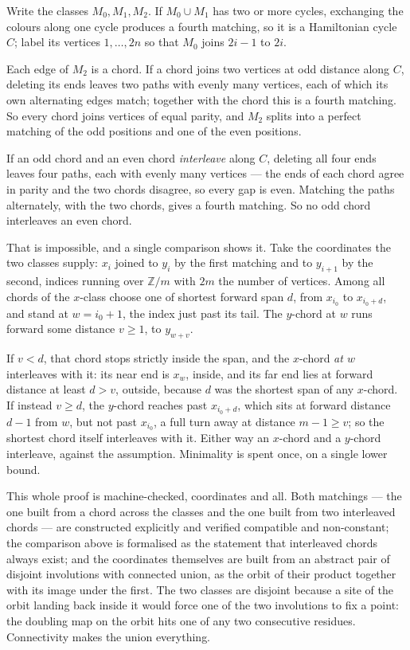 \documentclass[11pt]{article}
\theoremstyle{definition}
\theoremstyle{remark}
\begin{document}
Write the classes $M_0, M_1, M_2$. If $M_0 \cup M_1$ has two or more cycles, exchanging
the colours along one cycle produces a fourth matching, so it is a Hamiltonian cycle $C$;
label its vertices $1,\dots,2n$ so that $M_0$ joins $2i-1$ to $2i$.

Each edge of $M_2$ is a chord. If a chord joins two vertices at odd distance along $C$,
deleting its ends leaves two paths with evenly many vertices, each of which its own
alternating edges match; together with the chord this is a fourth matching. So every
chord joins vertices of equal parity, and $M_2$ splits into a perfect matching of the odd
positions and one of the even positions.

If an odd chord and an even chord \emph{interleave} along $C$, deleting all four ends
leaves four paths, each with evenly many vertices --- the ends of each chord agree in
parity and the two chords disagree, so every gap is even. Matching the paths alternately,
with the two chords, gives a fourth matching. So no odd chord interleaves an even chord.

That is impossible, and a single comparison shows it. Take the coordinates the two classes
supply: $x_i$ joined to $y_i$ by the first matching and to $y_{i+1}$ by the second, indices
running over $\mathbb{Z}/m$ with $2m$ the number of vertices. Among all chords of the
$x$-class choose one of shortest forward span $d$, from $x_{i_0}$ to $x_{i_0+d}$, and stand
at $w = i_0 + 1$, the index just past its tail. The $y$-chord at $w$ runs forward some
distance $v \geq 1$, to $y_{w+v}$.

If $v < d$, that chord stops strictly inside the span, and the $x$-chord \emph{at $w$}
interleaves with it: its near end is $x_w$, inside, and its far end lies at forward
distance at least $d > v$, outside, because $d$ was the shortest span of any $x$-chord. If
instead $v \geq d$, the $y$-chord reaches past $x_{i_0+d}$, which sits at forward distance
$d-1$ from $w$, but not past $x_{i_0}$, a full turn away at distance $m-1 \geq v$; so the
shortest chord itself interleaves with it. Either way an $x$-chord and a $y$-chord
interleave, against the assumption. Minimality is spent once, on a single lower bound.

This whole proof is machine-checked, coordinates and all. Both matchings --- the one built
from a chord across the classes and the one built from two interleaved chords --- are
constructed explicitly and verified compatible and non-constant; the comparison above is
formalised as the statement that interleaved chords always exist; and the coordinates
themselves are built from an abstract pair of disjoint involutions with connected union, as
the orbit of their product together with its image under the first. The two classes are
disjoint because a site of the orbit landing back inside it would force one of the two
involutions to fix a point: the doubling map on the orbit hits one of any two consecutive
residues. Connectivity makes the union everything.
\end{document}
